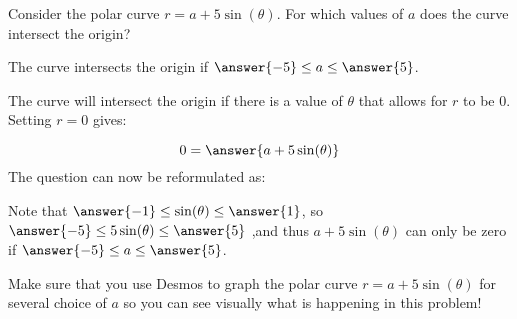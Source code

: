 \documentclass{ximera}
\author{Jim Talamo}
\begin{document}
\begin{exercise}
Consider the polar curve $r = a+5\sin(\theta)$.  For which values of $a$ does the curve intersect the origin?

The curve intersects the origin if $\answer{-5} \leq a \leq \answer{5}$.

\begin{hint}
The curve will intersect the origin if there is a value of $\theta$ that allows for $r$ to be $0$.  Setting $r=0$ gives:

\[
0 = \answer{a+5 \sin(\theta)}
\]
The question can now be reformulated as: 
\begin{multipleChoice}
\end{multipleChoice}

Note that $\answer{-1} \leq \sin(\theta) \leq \answer{1}$, so $\answer{-5} \leq 5\sin(\theta) \leq \answer{5}$ ,and thus $a+5 \sin(\theta)$ can only be zero if $\answer{-5} \leq a \leq \answer{5}$.
\end{hint}

Make sure that you use Desmos to graph the polar curve $r = a+5\sin(\theta)$ for several choice of $a$ so you can see visually what is happening in this problem!

\end{exercise}
\end{document}
